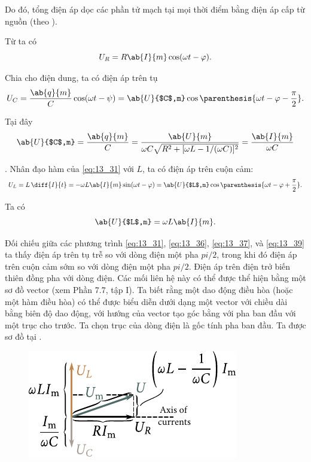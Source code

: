 \noindent
Do đó, tổng điện áp dọc các phần tử mạch tại mọi thời điểm bằng điện áp cấp từ nguồn (theo ).

Từ  ta có
\begin{equation}\label{eq:13_36}
    U_R = R \ab{I}{m} \cos(\omega t - \varphi).
\end{equation}

\noindent
Chia  cho điện dung, ta có điện áp trên tụ
\begin{equation}\label{eq:13_37}
    U_C = \frac{\ab{q}{m}}{C} \cos(\omega t - \psi) = \ab{U}{$C$,m} \cos\parenthesis{\omega t - \varphi - \frac{\pi}{2}}.
\end{equation}

\noindent
Tại đây
\begin{equation}\label{eq:13_38}
    \ab{U}{$C$,m} = \frac{\ab{q}{m}}{C}  = \frac{\ab{U}{m}}{\omega C \sqrt{R^2 + [\omega L - 1/(\omega C)]^2}} = \frac{\ab{I}{m}}{\omega C}
\end{equation}

.
Nhân đạo hàm của \eqref{eq:13_31} với $L$, ta có điện áp trên cuộn cảm:
\begin{equation}\label{eq:13_39}
    U_L = L\, \diff{I}{t} = - \omega L \ab{I}{m} \sin(\omega t - \varphi) = \ab{U}{$L$,m} \cos\parenthesis{\omega t - \varphi + \frac{\pi}{2}}.
\end{equation}

\noindent
Ta có
\begin{equation}\label{eq:13_40}
    \ab{U}{$L$,m} = \omega L \ab{I}{m}.
\end{equation}

Đối chiếu giữa các phương trình \eqref{eq:13_31}, \eqref{eq:13_36}, \eqref{eq:13_37}, và \eqref{eq:13_39} ta thấy điện áp trên tụ trễ so với dòng điện một pha $pi/2$, trong khi đó điện áp trên cuộn cảm sớm so với dòng điện một pha $pi/2$. Điện áp trên điện trở biến thiên đồng pha với dòng điện. 
Các mối liên hệ này có thể được thể hiện bằng một sơ đồ vector (xem Phần 7.7, tập I).
Ta biết rằng một dao động điều hòa (hoặc một hàm điều hòa) có thể được biểu diễn dưới dạng một vector với chiều dài bằng biên độ dao động, với hướng của vector tạo góc bằng với pha ban đầu với một trục cho trước.
Ta chọn trục của dòng điện là gốc tính pha ban đầu.
Ta được sơ đồ tại .

\begin{figure}[t]
	\begin{center}
		\includegraphics[scale=1]{figures/ch_13/fig_13_6.pdf}
		\caption[]{}
		\label{fig:13_6}
	\end{center}
	\vspace{-0.8cm}
\end{figure}

